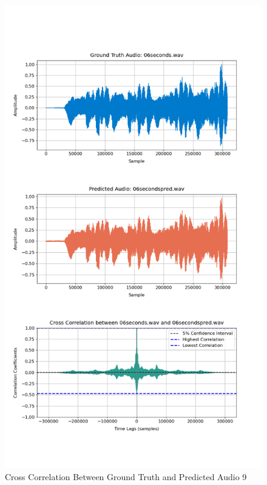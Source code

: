 \documentclass{ioereport}
\begin{document}
    \begin{figure}[H]
        \centering
        \includegraphics[width=\linewidth]{assets/crosscorrelation/cross_correlation_06seconds_06secondspred.png}
        \caption{Cross Correlation Between Ground Truth and Predicted Audio 9}
        \label{fig:cross-correlation-9}
    \end{figure}
\end{document}
